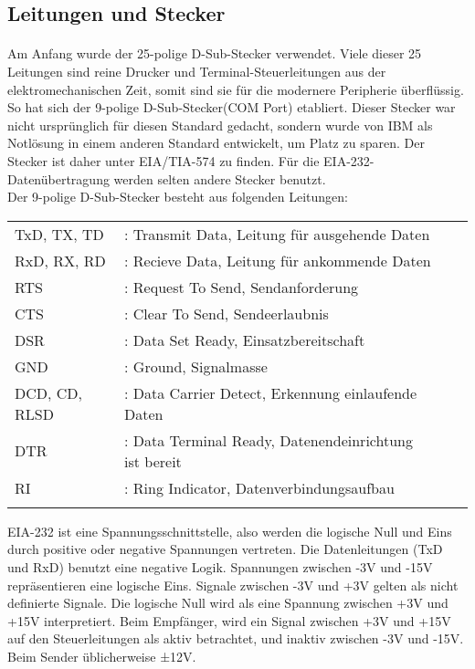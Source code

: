 \subsection{Leitungen und Stecker}
\paragraph{}
Am Anfang wurde der 25-polige D-Sub-Stecker verwendet. Viele dieser 25 Leitungen sind reine Drucker und Terminal-Steuerleitungen aus der elektromechanischen Zeit, somit sind sie für die modernere Peripherie überflüssig. So hat sich der 9-polige D-Sub-Stecker(COM Port) etabliert. Dieser Stecker war nicht ursprünglich für diesen Standard gedacht, sondern wurde von IBM als Notlösung in einem anderen Standard entwickelt, um Platz zu sparen. Der Stecker ist daher unter EIA/TIA-574 zu finden. Für die EIA-232-Datenübertragung werden selten andere Stecker benutzt.
\\
Der 9-polige D-Sub-Stecker besteht aus folgenden Leitungen:\\
\begin{tabular}{llll}
\\
TxD, TX, TD &: Transmit Data, Leitung für ausgehende Daten \\
RxD, RX, RD &: Recieve Data, Leitung für ankommende Daten \\
RTS &: Request To Send, Sendanforderung \\
CTS &: Clear To Send, Sendeerlaubnis \\
DSR &: Data Set Ready, Einsatzbereitschaft \\
GND &: Ground, Signalmasse \\
DCD, CD, RLSD &: Data Carrier Detect, Erkennung einlaufende Daten \\
DTR &: Data Terminal Ready, Datenendeinrichtung ist bereit \\
RI &: Ring Indicator, Datenverbindungsaufbau \\\\
\end{tabular}


EIA-232 ist eine Spannungsschnittstelle, also werden die logische Null und Eins durch positive oder negative Spannungen vertreten. Die Datenleitungen (TxD und RxD) benutzt eine negative Logik. Spannungen zwischen -3V und -15V repräsentieren eine logische Eins. Signale zwischen -3V und +3V gelten als nicht definierte Signale. Die logische Null wird als eine Spannung zwischen +3V und +15V interpretiert. Beim Empfänger, wird ein Signal zwischen +3V und +15V auf den Steuerleitungen als aktiv betrachtet, und inaktiv zwischen -3V und -15V. Beim Sender üblicherweise ±12V.\\

